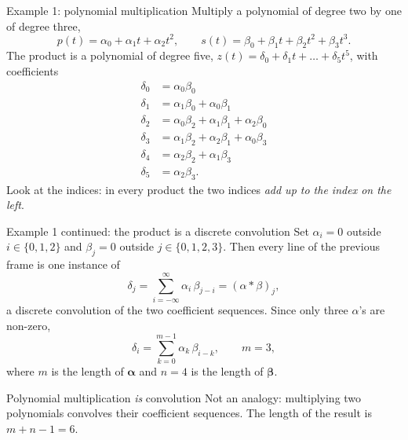 \documentclass[10pt,aspectratio=169]{beamer}
\begin{document}
\begin{frame}{Example 1: polynomial multiplication}
\small
Multiply a polynomial of degree two by one of degree three,
\[
  p(t)=\alpha_0+\alpha_1t+\alpha_2t^{2},\qquad
  s(t)=\beta_0+\beta_1t+\beta_2t^{2}+\beta_3t^{3}.
\]
The product is a polynomial of degree five,
$z(t)=\delta_0+\delta_1t+\dots+\delta_5t^{5}$, with coefficients
\begin{align*}
  \delta_0&=\alpha_0\beta_0\\
  \delta_1&=\alpha_1\beta_0+\alpha_0\beta_1\\
  \delta_2&=\alpha_0\beta_2+\alpha_1\beta_1+\alpha_2\beta_0\\
  \delta_3&=\alpha_1\beta_2+\alpha_2\beta_1+\alpha_0\beta_3\\
  \delta_4&=\alpha_2\beta_2+\alpha_1\beta_3\\
  \delta_5&=\alpha_2\beta_3 .
\end{align*}
Look at the indices: in every product the two indices \emph{add up to the
index on the left}.
\end{frame}

\begin{frame}{Example 1 continued: the product is a discrete convolution}
\small
Set $\alpha_i=0$ outside $i\in\{0,1,2\}$ and $\beta_j=0$ outside
$j\in\{0,1,2,3\}$.  Then every line of the previous frame is one instance
of
\[
  \delta_j=\sum_{i=-\infty}^{\infty}\alpha_i\,\beta_{j-i}=(\alpha*\beta)_j ,
\]
a discrete convolution of the two coefficient sequences.  Since only three
$\alpha$'s are non-zero,
\[
  \delta_i=\sum_{k=0}^{m-1}\alpha_k\,\beta_{i-k},\qquad m=3 ,
\]
where $m$ is the length of $\bm{\alpha}$ and $n=4$ is the length of
$\bm{\beta}$.
\begin{block}{Polynomial multiplication \emph{is} convolution}
Not an analogy: multiplying two polynomials convolves their coefficient
sequences.  The length of the result is $m+n-1=6$.
\end{block}
\end{frame}
\end{document}

